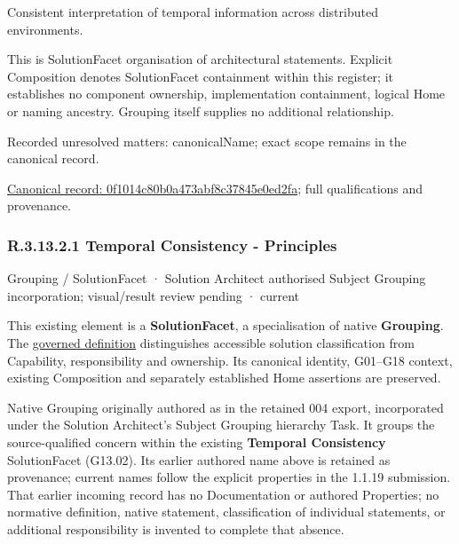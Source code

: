 Consistent interpretation of temporal information across distributed environments.



This is SolutionFacet organisation of architectural statements. Explicit Composition denotes SolutionFacet containment within this register; it establishes no component ownership, implementation containment, logical Home or naming ancestry. Grouping itself supplies no additional relationship.


{\small Recorded unresolved matters: canonicalName; exact scope remains in the canonical record.}\par
{\footnotesize \href{../../../../../../../continuum/grouping/0f1014c80b0a473abf8c37845e0ed2fa.md}{Canonical record: 0f1014c80b0a473abf8c37845e0ed2fa}; full qualifications and provenance.}\par
\subsubsection*{R.3.13.2.1 Temporal Consistency - Principles}
\label{navigation:R.3.13.2.1}

\label{element:8e39da9fc2d443efa3cc5d0311fcaf79}
{\small Grouping / SolutionFacet · Solution Architect authorised Subject Grouping incorporation; visual/result review pending · current}\par

This existing element is a \textbf{SolutionFacet}, a specialisation of native
\textbf{Grouping}. The \href{\detokenize{../../../../../../../governance/continuum-representation.md#solutionfacet-classification--1119-candidate}}{governed definition}
distinguishes accessible solution classification from Capability, responsibility
and ownership. Its canonical identity, G01–G18 context, existing Composition
and separately established Home assertions are preserved.



Native Grouping originally authored as \texttt{} in the retained 004 export,
incorporated under the Solution Architect's Subject Grouping hierarchy Task.
It groups the source-qualified \texttt{} concern within
the existing \textbf{Temporal Consistency} SolutionFacet (G13.02). Its earlier authored name above is retained as provenance; current names
follow the explicit properties in the 1.1.19 submission.
That earlier incoming record has no Documentation or authored Properties; no normative
definition, native statement, classification of individual statements, or
additional responsibility is invented to complete that absence.




